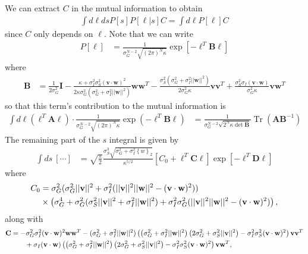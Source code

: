 \documentclass[11pt]{article}
\DeclareMathOperator{\Tr}{Tr}
\begin{document}
We can extract $C$ in the mutual information to obtain 
\begin{align}
	\int d\boldsymbol{\ell} ds P[s]P[\boldsymbol{\ell}|s] C = \int d\boldsymbol{\ell} P[\boldsymbol{\ell}] C
\end{align}
since $C$ only depends on $\boldsymbol{\ell}$. Note that we can write
\begin{align}
	P[\boldsymbol{\ell}] &= \frac{1}{\sigma_G^{N-2}\sqrt{(2\pi)^N \kappa}}\exp\left[-\boldsymbol{\ell}^T \mathbf{B} \boldsymbol{\ell}\right]
\end{align}
where
\begin{align}
	\mathbf{B} &= \frac{1}{2\sigma_G^2}\mathbf{I} -\frac{\kappa +\sigma_I^2 \sigma_S^2 (\mathbf{v}\cdot \mathbf{w})^2}{2 \kappa \sigma_G^2 (\sigma_G^2 + \sigma_I^2 ||\mathbf{w}||^2)}\mathbf{w}\mathbf{w}^T - \frac{\sigma_S^2(\sigma_G^2 + \sigma_I^2 ||\mathbf{w}||^2)}{2 \sigma_G^2 \kappa}\mathbf{v}\mathbf{v}^T + \frac{\sigma_S^2 \sigma_I(\mathbf{v}\cdot\mathbf{w}) }{\sigma_G^2 \kappa }\mathbf{v}\mathbf{w}^T
\end{align}
so that this term's contribution to the mutual information is 
\begin{align}
	\int d\boldsymbol{\ell} (\boldsymbol{\ell}^T \mathbf{A} \boldsymbol{\ell}) \cdot \frac{1}{\sigma_G^{N-2}\sqrt{(2\pi)^N \kappa}} \exp(-\boldsymbol{\ell}^T \mathbf{B} \boldsymbol{\ell}) &= \frac{1}{\sigma_G^{N-2}\sqrt{2^N \kappa \det \mathbf{B}}} \Tr (\mathbf{A} \mathbf{B}^{-1}) 
\end{align}
The remaining part of the $s$ integral is given by
\begin{align}
\int ds  \ [\cdots] &= \sqrt{\frac{\pi}{2}} \frac{\sigma_S^3 \sqrt{\sigma_G^2 +\sigma_I^2 \left\{w\right\}_2}}{\kappa^{5/2}} \left[C_0 + \boldsymbol{\ell}^T \mathbf{C} \boldsymbol{\ell}\right] \exp\left[-\boldsymbol{\ell}^T \mathbf{D} \boldsymbol{\ell}\right]
\end{align}
where 
\begin{align}
C_0 &= \sigma_G^2 (\sigma_G^2 ||\mathbf{v}||^2 + \sigma_I^2 (||\mathbf{v}||^2 ||\mathbf{w}||^2 - (\mathbf{v}\cdot \mathbf{w})^2))\notag \\
&\times \left(\sigma_G^4 + \sigma_G^2 (\sigma_S^2 ||\mathbf{v}||^2 +\sigma_I^2 ||\mathbf{w}||^2) + \sigma_I^2 \sigma_G^2 (||\mathbf{v}||^2 ||\mathbf{w}||^2 - (\mathbf{v}\cdot \mathbf{w})^2)\right),
\end{align}
along with
\begin{align}
	\mathbf{C} &= -\sigma_G^2 \sigma_I^2 (\mathbf{v}\cdot\mathbf{w})^2  \mathbf{w}\mathbf{w}^T - (\sigma_G^2 +\sigma_I^2 ||\mathbf{w}||^2)\left(\left(\sigma_G^2+\sigma_I^2 ||\mathbf{w}||^2\right) \left(2 \sigma_G^2+\sigma_S^2 ||\mathbf{v}||^2\right) - \sigma_I^2 \sigma_S^2 (\mathbf{v}\cdot\mathbf{w})^2\right)\mathbf{v}\mathbf{v}^T \notag \\
	&\qquad + \sigma_I (\mathbf{v} \cdot \mathbf{w}) \left(\left(\sigma_G^2+\sigma_I^2 ||\mathbf{w}||^2\right) \left(2 \sigma_G^2+\sigma_S^2 ||\mathbf{v}||^2\right) - \sigma_I^2 \sigma_S^2 (\mathbf{v}\cdot\mathbf{w})^2\right)\mathbf{v}\mathbf{w}^T,
\end{align}
\end{document}
